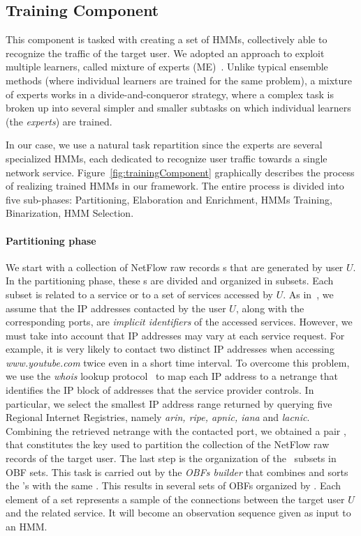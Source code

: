 \documentclass[10pt,conference,compsocconf,letterpaper]{IEEEtran}
\begin{document}
\subsection{Training Component}
This component is tasked with creating a set of HMMs,
collectively able to recognize the traffic of the target user.  We 
adopted an approach to exploit multiple learners, called mixture of
experts (ME)~\cite{Zhou2012}. Unlike typical ensemble
methods (where individual learners are trained for the same problem), 
a mixture of experts works in a divide-and-conqueror strategy, where a
complex task is broken up into several simpler and smaller subtasks
on which individual learners (the \textit{experts}) are trained. 

In our case, we use a natural task repartition
since the experts are several specialized HMMs, each dedicated to
recognize user traffic towards a single network service.
Figure~\ref{fig:trainingComponent} graphically describes the process
of realizing trained HMMs in our framework. The entire process is divided into five
sub-phases: Partitioning, Elaboration and Enrichment, HMMs Training,
Binarization, HMM Selection.

\paragraph{Partitioning phase}
We start with a collection of NetFlow raw records  \nfr s that are
generated by user $U$.
In the partitioning phase, these \nfr s
are divided and organized in subsets. 
Each subset is related to a service or to a
set of services accessed by $U$. As in~\cite{Pang2007}, 
we assume that the IP addresses
contacted by the user $U$, along with the corresponding ports, are
\textit{implicit identifiers} of the accessed services. 
However, we must take into account that IP addresses 
may vary at each service request. For example, it is very likely 
to contact two distinct IP addresses when accessing
\textit{www.youtube.com} twice even in a short time interval. 
To overcome this problem, we use the \textit{whois} lookup
protocol~\cite{Daigle2004} to map each IP address to a
netrange that identifies the IP block of addresses that the service
provider controls.  In particular, we select the smallest IP
address range returned by querying five Regional Internet Registries,
namely \textit{arin, ripe, apnic, iana} and \textit{lacnic}.
Combining the retrieved netrange with the contacted port, we obtained a
pair \netport, that constitutes the key used to partition the
collection of the NetFlow raw records of the target user. The last step is the
organization of the \netport\ subsets in OBF sets. This task is carried out 
by the \textit{OBFs builder} that combines and sorts the \nfr's with the same
\netport. This results in several sets of OBFs organized by
\netport. Each element of a set represents a sample of the connections between
the target user $U$ and the related service.  It will become an
observation sequence given as input to an HMM. 
\end{document}
